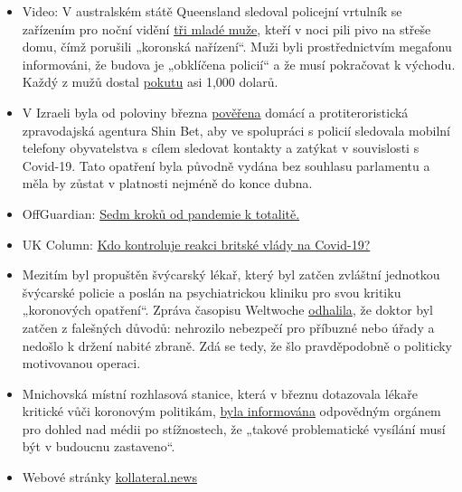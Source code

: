 \begin{itemize}
\tightlist
\item
  Video: V australském státě Queensland sledoval policejní vrtulník se
  zařízením pro noční vidění
  \href{https://twitter.com/Independent/status/1252911273597120513}{tři
  mladé muže}, kteří v noci pili pivo na střeše domu, čímž porušili
  „koronská nařízení``. Muži byli prostřednictvím megafonu informováni,
  že budova je „obklíčena policií`` a že musí pokračovat k východu.
  Každý z mužů dostal
  \href{https://www.dailystar.co.uk/news/world-news/police-helicopter-uses-night-vision-21899640}{pokutu}
  asi 1,000 dolarů.
\item
  V Izraeli byla od poloviny března
  \href{https://www.jewishpress.com/news/the-courts/state-to-high-court-even-more-shin-bet-involvement-in-fighting-the-coronavirus/2020/04/14/}{pověřena}
  domácí a protiteroristická zpravodajská agentura Shin Bet, aby ve
  spolupráci s policií sledovala mobilní telefony obyvatelstva s cílem
  sledovat kontakty a zatýkat v souvislosti s Covid-19. Tato opatření
  byla původně vydána bez souhlasu parlamentu a měla by zůstat v
  platnosti nejméně do konce dubna.
\item
  OffGuardian:
  \href{https://off-guardian.org/2020/04/23/the-seven-step-path-from-pandemic-to-totalitarianism/}{Sedm
  kroků od pandemie k totalitě.}
\item
  UK Column:
  \href{https://www.ukcolumn.org/article/who-controls-british-government-response-covid19-part-one}{Kdo
  kontroluje reakci britské vlády na Covid-19?}
\item
  Mezitím byl propuštěn švýcarský lékař, který byl zatčen zvláštní
  jednotkou švýcarské policie a poslán na psychiatrickou kliniku pro
  svou kritiku „koronových opatření``. Zpráva časopisu Weltwoche
  \href{https://uncut-news.ch/wp-content/uploads/2020/04/Wer-l\%C3\%B6ste-den-Fehlalarm-aus.pdf}{odhalila},
  že doktor byl zatčen z falešných důvodů: nehrozilo nebezpečí pro
  příbuzné nebo úřady a nedošlo k držení nabité zbraně. Zdá se tedy, že
  šlo pravděpodobně o politicky motivovanou operaci. 
\item
  Mnichovská místní rozhlasová stanice, která v březnu dotazovala lékaře
  kritické vůči koronovým politikám,
  \href{https://norberthaering.de/medienversagen/radiomuenchen-blm-meinungsvielfalt/}{byla
  informována} odpovědným orgánem pro dohled nad médii po stížnostech,
  že „takové problematické vysílání musí být v budoucnu zastaveno``.
\item
  Webové stránky \href{https://kollateral.news/}{kollateral.news}

\end{itemize}
